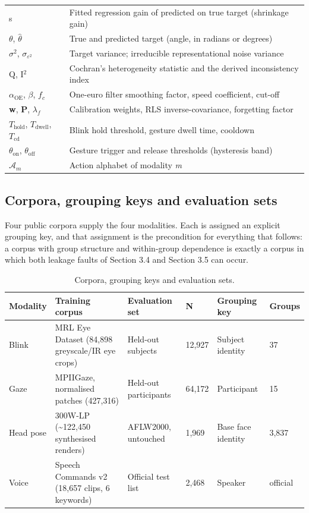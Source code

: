 \begin{table}[pos=htbp]
\begin{tabularx}{\textwidth}{XX}
s & Fitted regression gain of predicted on true target (shrinkage gain) \\
$\theta$, $\hat{\theta }$ & True and predicted target (angle, in radians or degrees) \\
$\sigma^{2}$, $\sigma_{\varepsilon^{2}}$ & Target variance; irreducible representational noise variance \\
Q, I$^{2}$ & Cochran's heterogeneity statistic and the derived inconsistency index \\
$\alpha_{\mathrm{OE}}$, $\beta$, $f_{c}$ & One-euro filter smoothing factor, speed coefficient, cut-off \\
\textbf{w}, \textbf{P}, $\lambda_{f}$ & Calibration weights, RLS inverse-covariance, forgetting factor \\
$T_{\mathrm{hold}}$, $T_{\mathrm{dwell}}$, $T_{\mathrm{cd}}$ & Blink hold threshold, gesture dwell time, cooldown \\
$\theta_{\mathrm{on}}$, $\theta_{\mathrm{off}}$ & Gesture trigger and release thresholds (hysteresis band) \\
$\mathcal{A}_{m}$ & Action alphabet of modality \emph{m} \\
\bottomrule
\end{tabularx}
\end{table}

\FloatBarrier

\subsection{Corpora, grouping keys and evaluation sets}

Four public corpora supply the four modalities. Each is assigned an explicit grouping key, and that assignment is the precondition for everything that follows: a corpus with group structure and within-group dependence is exactly a corpus in which both leakage faults of Section 3.4 and Section 3.5 can occur.

\begin{table}[pos=htbp]
\centering
\caption{Corpora, grouping keys and evaluation sets.}
\label{tab:4}
\footnotesize
\begin{tabularx}{\textwidth}{XXXXXX}
\toprule
\textbf{Modality} & \textbf{Training corpus} & \textbf{Evaluation set} & \textbf{N} & \textbf{Grouping key} & \textbf{Groups} \\
\midrule
Blink & MRL Eye Dataset (84,898 greyscale/IR eye crops) & Held-out subjects & 12,927 & Subject identity & 37 \\
Gaze & MPIIGaze, normalised patches (427,316) & Held-out participants & 64,172 & Participant & 15 \\
Head pose & 300W-LP (\textasciitilde{}122,450 synthesised renders) & AFLW2000, untouched & 1,969 & Base face identity & 3,837 \\
Voice & Speech Commands v2 (18,657 clips, 6 keywords) & Official test list & 2,468 & Speaker & official \\
\bottomrule
\end{tabularx}
\end{table}

